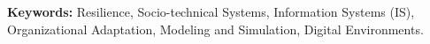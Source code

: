\documentclass[12pt, letterpaper]{article}
\begin{document}
\vspace{15pt}
\noindent \textbf{Keywords:} Resilience, Socio-technical Systems, Information Systems (IS), Organizational Adaptation, Modeling and Simulation, Digital Environments.

\newpage










\printbibliography


\end{document}
